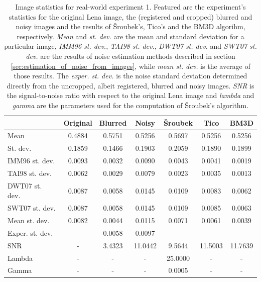 \documentclass[12pt,notitlepage]{report}
\begin{document}
\begin{table}[htb]
  \centering
  \begin{tabular}{ | l | c | c | c | c | c | c | }
    \hline
		           & Original & Blurred & Noisy   & Šroubek & Tico    & BM3D    \\ \hline
	Mean           & 0.4884   & 0.5751  & 0.5256  & 0.5697  & 0.5256  & 0.5256  \\ \hline
	St. dev.       & 0.1859   & 0.1466  & 0.1903  & 0.2059  & 0.1890  & 0.1899  \\ \hline
	IMM96 st. dev. & 0.0093   & 0.0032  & 0.0090  & 0.0043  & 0.0041  & 0.0019  \\ \hline
	TAI98 st. dev. & 0.0062   & 0.0029  & 0.0079  & 0.0023  & 0.0035  & 0.0013  \\ \hline
	DWT07 st. dev. & 0.0087   & 0.0058  & 0.0145  & 0.0109  & 0.0083  & 0.0062  \\ \hline
	SWT07 st. dev. & 0.0087   & 0.0058  & 0.0145  & 0.0109  & 0.0085  & 0.0063  \\ \hline
	Mean st. dev.  & 0.0082   & 0.0044  & 0.0115  & 0.0071  & 0.0061  & 0.0039  \\ \hline
	Exper. st. dev.& -        & 0.0058  & 0.0097  & -       & -       & -       \\ \hline
	SNR            & -        & 3.4323  & 11.0442 & 9.5644  & 11.5003 & 11.7639 \\ \hline
	Lambda         & -        & -       & -       & 25.0000 & -       & -       \\ \hline
	Gamma          & -        & -       & -       & 0.0005  & -       & -       \\ \hline

  \end{tabular}
  \caption[Image statistics for real-world experiment 1]{Image statistics for real-world experiment 1. Featured are the experiment's statistics for the original Lena image, the (registered and cropped) blurred and noisy images and the results of Šroubek's, Tico's and the BM3D algorihm, respectively. {\em Mean} and {\em st. dev.} are the mean and standard deviation for a particular image, {\em IMM96 st. dev.}, {\em TAI98 st. dev.}, {\em DWT07 st. dev.} and {\em SWT07 st. dev.} are the results of noise estimation methods described in section \ref{sec:estimation_of_noise_from_images}, while {\em mean st. dev.} is the average of those results. The {\em exper. st. dev.} is the noise standard deviation determined directly from the uncropped, albeit registered, blurred and noisy images. {\em SNR} is the signal-to-noise ratio with respect to the original Lena image and {\em lambda} and {\em gamma} are the parameters used for the computation of Šroubek's algorithm.}
  \label{tab:experiment_001_statistics}
\end{table}
\end{document}
